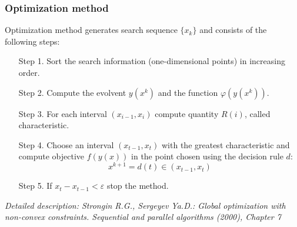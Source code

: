 \documentclass[aspectratio=1610]{beamer}
\begin{document}
\begin{frame}
  \frametitle{Optimization method}
  Optimization method generates search sequence \(\{x_k\}\) and consists of the following steps:
  \begin{enumerate}
    \setlength{\itemindent}{.1in}
    \item[Step 1.] Sort the search information (one-dimensional points) in increasing order.
    \item[Step 2.] Compute the evolvent \(y(x^k)\) and the function \(\varphi(y(x^k))\).
    \item[Step 3.] For each interval \((x_{i-1}, x_i)\) compute quantity \(R(i)\), called characteristic.
    \item[Step 4.] Choose an interval \((x_{t-1}, x_t)\) with the greatest characteristic and
    compute objective \(f(y(x))\) in the point chosen using the decision rule \(d\):
    \begin{displaymath}
      x^{k+1}=d(t)\in (x_{t-1}, x_t)
    \end{displaymath}
    \item[Step 5.] If \(x_{t}-x_{t-1}<\varepsilon\) stop the method.
  \end{enumerate}
  \textit{\footnotesize	{Detailed description: Strongin R.G., Sergeyev Ya.D.: Global optimization with non-convex constraints. Sequential and parallel algorithms (2000), Chapter 7}}
\end{frame}
\end{document}
